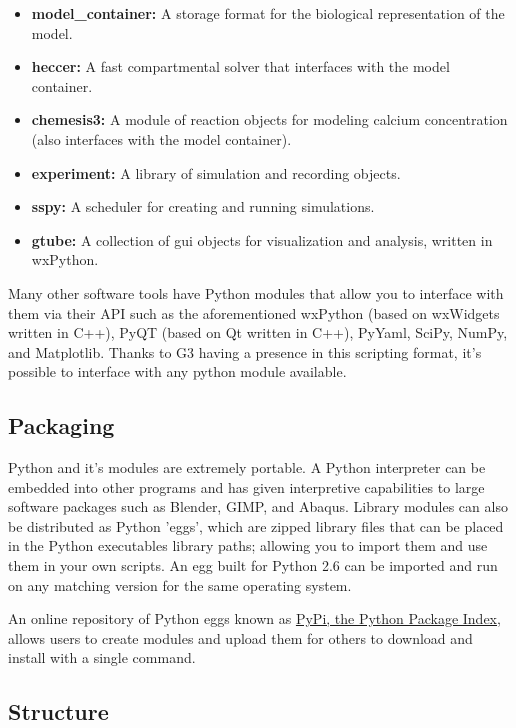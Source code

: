 \documentclass[12pt]{article}
\begin{document}
\begin{itemize}
\item[]  {\bf model\_container:} A storage format for the biological representation of the model.
\item[]{\bf heccer:} A fast compartmental solver that interfaces with the model container. 
\item[] {\bf chemesis3:} A module of reaction objects for modeling calcium concentration (also interfaces with the model container).
\item[] {\bf experiment:} A library of simulation and recording objects.
\item[] {\bf sspy:} A scheduler for creating and running simulations.
\item[] {\bf gtube:} A collection of gui objects for visualization and analysis, written in wxPython.
\end{itemize}

Many other software tools have Python modules that allow you to interface with them via their API such as the aforementioned wxPython (based on wxWidgets written in C++), PyQT (based on Qt written in C++), PyYaml, SciPy, NumPy, and Matplotlib. Thanks to G3 having a presence in this scripting format, it's possible to interface with any python module available. 


\subsection*{Packaging}

Python and it's modules are extremely portable. A Python interpreter can be embedded into other programs and has given interpretive capabilities to large software packages such as Blender, GIMP, and Abaqus. Library modules can also be distributed as Python 'eggs', which are zipped library files that can be placed in the Python executables library paths; allowing you to import them and use them in your own scripts. An egg built for Python 2.6 can be imported and run on any matching version for the same operating system. 

An online repository of Python eggs known as \href{http://pypi.python.org/}{PyPi, the Python Package Index}, allows users to create modules and upload them for others to download and install with a single command.


\subsection*{Structure}
\end{document}
